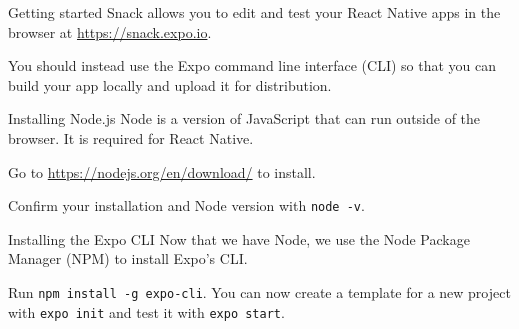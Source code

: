 \documentclass{beamer}
\begin{document}
\begin{frame}{Getting started}
	Snack allows you to edit and test your React Native apps in the browser at \href{https://snack.expo.io}{https://snack.expo.io}.

	\bigskip\pause

	You should instead use the Expo command line interface (CLI) so that you can build your app locally and upload it for distribution.
\end{frame}

\begin{frame}{Installing Node.js}
	Node is a version of JavaScript that can run outside of the browser. It is required for React Native.

	\bigskip\pause

	Go to \href{https://nodejs.org/en/download/}{https://nodejs.org/en/download/} to install.

	\bigskip\pause

	Confirm your installation and Node version with \texttt{node -v}.
\end{frame}

\begin{frame}{Installing the Expo CLI}
	Now that we have Node, we use the Node Package Manager (NPM) to install Expo's CLI.

	\bigskip\pause

	Run \texttt{npm install -g expo-cli}. \pause You can now create a template for a new project with \texttt{expo init} and test it with \texttt{expo start}.
\end{frame}
\end{document}
